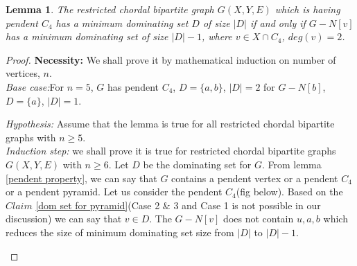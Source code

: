 \documentclass[11pt]{article}
\newtheorem{lemma}{Lemma}
\begin{document}
\begin{lemma} \label{min dom set for c4}
The restricted chordal bipartite graph $G(X,Y,E)$ which is having pendent $C_4$ has a minimum dominating set $D$ of size $|D|$ if and only if $ G-N[v]$ has a minimum dominating set of size $|D|-1$, where $v \in X \cap C_4$, $deg(v) = 2$.
\end{lemma}
\begin{proof}
 \textbf{Necessity:}
We shall prove it by mathematical induction on number of vertices, $n$. \medskip \\
\textit{Base case:}For $n=5$, $G$ has pendent $C_4$, $D = \{ a,b \}$, $|D|=2$ for $ G-N[b]$, $D= \big \{ a \big \}$, $|D|=1$.
\begin{center}
\end{center}
\medskip
%
%
\textit{Hypothesis:} Assume that the lemma is true for all restricted chordal bipartite graphs with $n \geq 5$.         \medskip \\
%
\textit{Induction step:} we shall prove it is true for restricted chordal bipartite graphs $G(X,Y,E)$ with $n \geq 6$. Let $D$ be the dominating set for $G$. From lemma \ref{pendent property}, we can say that $G$ contains a pendent vertex or a pendent $C_4$ or a pendent pyramid. Let us consider the pendent $C_4$(fig below). Based on the $Claim$ \ref{dom set for pyramid}(Case 2 $\&$ 3 and Case 1 is not possible in our discussion) we can say that $v \in D$. The $G-N[v]$ does not contain $u,a,b$ which reduces the size of minimum dominating set size from $|D|$ to $|D| - 1$.
\begin{center}
\end{center}
\end{proof}
\end{document}
